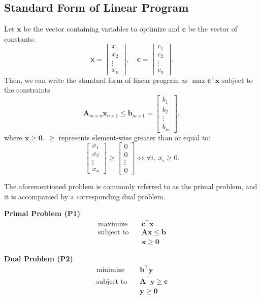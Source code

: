 \documentclass[twoside]{article}
\begin{document}
\subsection{Standard Form of Linear Program}
Let $\mathbf{x}$ be the vector containing variables to optimize and $\mathbf{c}$
be the vector of constants: \[
    \mathbf{x} = \begin{bmatrix} x_1 \\ x_2 \\ \vdots \\ x_n \end{bmatrix},
    \quad
    \mathbf{c} = \begin{bmatrix} c_1 \\ c_2 \\ \vdots \\ c_n \end{bmatrix}.
\] Then, we can write the standard form of linear program as
$\max \mathbf{c}^\top \mathbf{x}$ subject to the constraints \[
    \mathbf{A}_{m \times n} \mathbf{x}_{n \times 1}
        \leq \mathbf{b}_{m \times 1}
        = \begin{bmatrix} b_1 \\ b_2 \\ \vdots \\ b_m \end{bmatrix},
\]
where $\mathbf{x} \geq \mathbf{0}.$ $\geq$ represents element-wise greater than or
equal to: \[
    \begin{bmatrix} x_1 \\ x_2 \\ \vdots \\ x_n \end{bmatrix}
        \geq \begin{bmatrix} 0 \\ 0 \\ \vdots \\ 0 \end{bmatrix}
    \iff \forall i,\ x_i \geq 0.
\]

The aforementioned problem is commonly referred to as the primal problem, and it
is accompanied by a corresponding dual problem.\\

\begin{minipage}[t]{0.45\textwidth}
  \centering
  \textbf{Primal Problem (P1)}
  \begin{align*}
    \text{maximize} \quad & \mathbf{c}^\top \mathbf{x} \\
    \text{subject to} \quad & \mathbf{Ax} \leq \mathbf{b} \\
    & \mathbf{x} \geq \mathbf{0}
  \end{align*}
\end{minipage}
\hfill
\begin{minipage}[t]{0.45\textwidth}
  \centering
  \textbf{Dual Problem (P2)}
  \begin{align*}
    \text{minimize} \quad & \mathbf{b}^\top \mathbf{y} \\
    \text{subject to} \quad & \mathbf{A}^\top \mathbf{y} \geq \mathbf{c} \\
    & \mathbf{y} \geq \mathbf{0}
  \end{align*}
\end{minipage}
\end{document}
